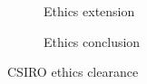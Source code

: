 \begin{figure}
\begin{subfigure}[t]{0.7\textwidth}
\caption{Ethics extension}
\end{subfigure}
\hfill
\begin{subfigure}[t]{0.7\textwidth}
\centering
{}
\caption{Ethics conclusion}
\end{subfigure}
\caption{CSIRO ethics clearance}
\label{fig:csiro_ethics}
\end{figure}

